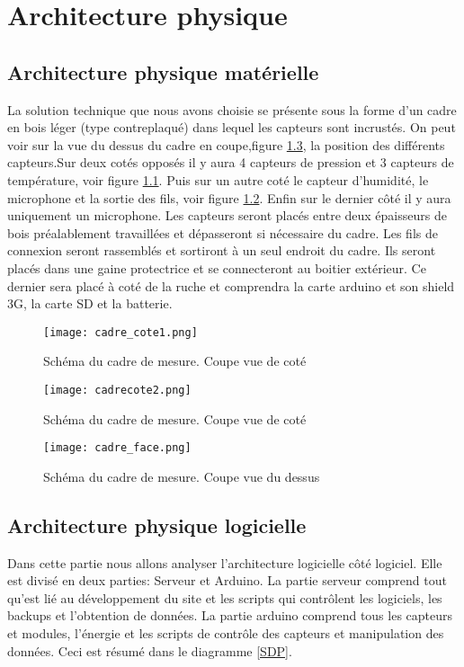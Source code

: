 
\chapter{Architecture physique}

\section{Architecture physique matérielle}
\vspace{1.5cm}
La solution technique que nous avons choisie se présente sous la forme d'un cadre en bois léger (type contreplaqué) dans lequel les capteurs sont incrustés. On peut voir sur la vue du dessus du cadre en coupe,figure \ref{fig:face}, la position des différents capteurs.Sur deux cotés opposés il y aura 4 capteurs de pression et 3 capteurs de température, voir figure \ref{fig:cote1}. Puis sur un autre coté le capteur d'humidité, le microphone et la sortie des fils, voir figure \ref{fig:cote2}. Enfin sur le dernier côté il y aura uniquement un microphone. Les capteurs seront placés entre deux épaisseurs de bois préalablement travaillées et dépasseront si nécessaire du cadre. Les fils de connexion seront rassemblés et sortiront à un seul endroit du cadre. Ils seront placés dans une gaine protectrice et se connecteront au boitier extérieur. Ce dernier sera placé à coté de la ruche et comprendra la carte arduino et son shield 3G, la carte SD et la batterie. 

\begin{figure}[h!]
\centering\texttt{[image: cadre\_cote1.png]}
\caption{\label{fig:cote1} Schéma du cadre de mesure. Coupe vue de coté}
\end{figure}

\begin{figure}[h!]
\centering\texttt{[image: cadrecote2.png]}
\caption{\label{fig:cote2} Schéma du cadre de mesure. Coupe vue de coté}
\end{figure}

\begin{figure}[h!]
\centering\texttt{[image: cadre\_face.png]}
\caption{\label{fig:face} Schéma du cadre de mesure. Coupe vue du dessus}
\end{figure}


\clearpage

\section{Architecture physique logicielle}
\vspace{1.5cm}
Dans cette partie nous allons analyser l'architecture logicielle côté logiciel. Elle est divisé en deux parties: Serveur et Arduino. La partie serveur comprend tout qu'est lié au développement du site et les scripts qui contrôlent les logiciels, les backups et l'obtention de données. La partie arduino comprend tous les capteurs et modules, l'énergie et les scripts de contrôle des capteurs et manipulation des données. Ceci est résumé dans le diagramme \ref{SDP}. 


